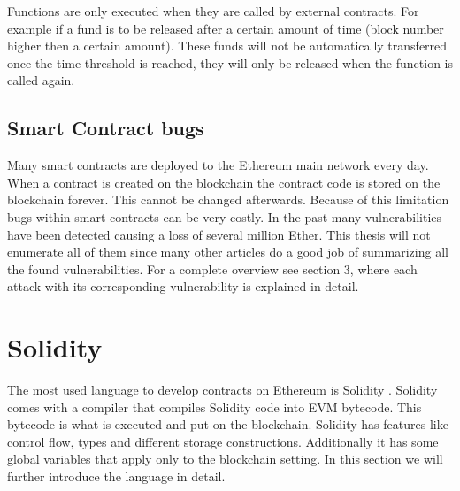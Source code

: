 \documentclass[a4paper]{article}
\begin{document}
Functions are only executed when they are called by external contracts. For example if a fund is to be released after a certain amount of time (block number higher then a certain amount). These funds will not be automatically transferred once the time threshold is reached, they will only be released when the function is called again.\par

\subsection{Smart Contract bugs}
Many smart contracts are deployed to the Ethereum main network every day. When a contract is created on the blockchain the contract code is stored on the blockchain forever. This cannot be changed afterwards. Because of this limitation bugs within smart contracts can be very costly. In the past many vulnerabilities have been detected causing a loss of several million Ether. This thesis will not enumerate all of them since many other articles do a good job of summarizing all the found vulnerabilities. For a complete overview see \cite{dika2017ethereum} section 3, where each attack with its corresponding vulnerability is explained in detail.

\newpage
\section{Solidity}
\label{sec:solidity}
The most used language to develop contracts on Ethereum is Solidity \cite{solidityreadthedocs}. Solidity comes with a compiler that compiles Solidity code into EVM bytecode. This bytecode is what is executed and put on the blockchain. Solidity has features like control flow, types and different storage constructions. Additionally it has some global variables that apply only to the blockchain setting. In this section we will further introduce the language in detail.
\end{document}
